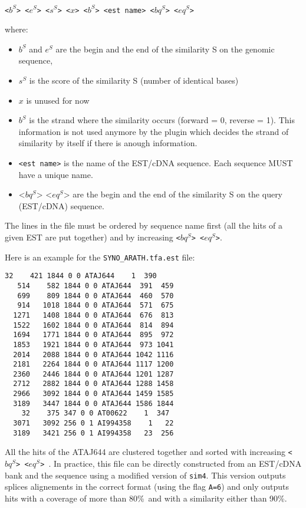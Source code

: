 \texttt{<$b^S$> <$e^S$> <$s^S$> <$x$> <$b^S$> <est name> <$bq^S$> <$eq^S$>}

where:
\begin{itemize}
\item $b^S$ and $e^S$ are the begin and the end of the similarity S on the genomic sequence,

\item $s^S$ is the score of the similarity S (number of identical bases)
\item $x$ is unused for now
\item $b^S$ is the strand where the similarity occurs (forward = 0,
  reverse = 1). This information is not used anymore by the plugin
  which decides the strand of similarity by itself if there is anough
  information.
\item \texttt{<est name>} is the name of the EST/cDNA sequence. Each
  sequence MUST have a unique name.
\item <$bq^S$> <$eq^S$> are the begin and the end of the similarity S
  on the query (EST/cDNA) sequence.
\end{itemize}
The lines in the file must be ordered by sequence name first (all the
hits of a given EST are put together) and by increasing
\texttt{<$bq^S$> <$eq^S$>}. 

Here is an example for the \texttt{SYNO\_ARATH.tfa.est} file:
\begin{Verbatim}[fontsize=\small]
    32    421 1844 0 0 ATAJ644    1  390
   514    582 1844 0 0 ATAJ644  391  459
   699    809 1844 0 0 ATAJ644  460  570
   914   1018 1844 0 0 ATAJ644  571  675
  1271   1408 1844 0 0 ATAJ644  676  813
  1522   1602 1844 0 0 ATAJ644  814  894
  1694   1771 1844 0 0 ATAJ644  895  972
  1853   1921 1844 0 0 ATAJ644  973 1041
  2014   2088 1844 0 0 ATAJ644 1042 1116
  2181   2264 1844 0 0 ATAJ644 1117 1200
  2360   2446 1844 0 0 ATAJ644 1201 1287
  2712   2882 1844 0 0 ATAJ644 1288 1458
  2966   3092 1844 0 0 ATAJ644 1459 1585
  3189   3447 1844 0 0 ATAJ644 1586 1844
    32    375 347 0 0 AT00622    1  347
  3071   3092 256 0 1 AI994358    1   22
  3189   3421 256 0 1 AI994358   23  256
\end{Verbatim}

All the hits of the ATAJ644 are clustered together and sorted with
increasing \texttt{<$bq^S$> <$eq^S$> }. In practice, this file can be
directly constructed from an EST/cDNA bank and the sequence using a
modified version of \texttt{sim4}. This version outputs splices
alignements in the correct format (using the flag \texttt{A=6}) and
only outputs hits with a coverage of more than 80\%\ and with a
similarity either than 90\%.

